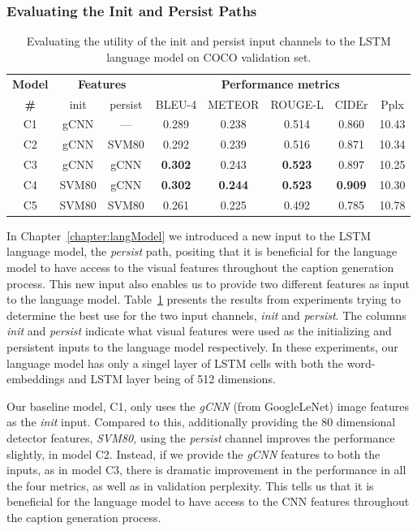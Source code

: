 \subsubsection{Evaluating the Init and Persist Paths}
\label{subsubsec:InitVpersist}
\begin{table}[htp]
  \centering
  \newcommand{\bs}{\small}
  \begin{adjustbox}{center}
  \begin{tabular}{|c||c|c||c|c|c|c|c|}
    \hline
    \bf Model & \multicolumn{2}{c||}{\bf Features 
    } & \multicolumn{5}{c|}{\bf Performance metrics}\\
     \cline{2-8}
    \bf \# & init & persist &\bs BLEU-4 &\bs METEOR &\bs ROUGE-L &\bs CIDEr&\bs Pplx \\\hline
    C1 & gCNN  & ---  & 0.289 & 0.238 & 0.514 & 0.860 & 10.43  \\
    C2 & gCNN  & SVM80& 0.292 & 0.239 & 0.516 & 0.871 & 10.34  \\
    C3 & gCNN  & gCNN &\bf 0.302 & 0.243 &\bf 0.523 & 0.897 & 10.25  \\
    C4 & SVM80 & gCNN &\bf 0.302 &\bf0.244 &\bf 0.523 &\bf0.909 & 10.30  \\
    C5 & SVM80 & SVM80& 0.261 & 0.225 & 0.492 & 0.785 & 10.78 \\\hline
  \end{tabular}
  \end{adjustbox}
  \caption{Evaluating the utility of the init and persist input channels to the
          LSTM language model on COCO validation set.}
  \label{tab:resCocInitVPers}
\end{table}

In Chapter~\ref{chapter:langModel} we introduced a new input to the LSTM language
model, the \emph{persist} path, positing that it is beneficial for the language
model to have access to the visual features throughout the caption generation
process.
This new input also enables us to provide two different features as input to the
language model.
Table~\ref{tab:resCocInitVPers} presents the results from experiments trying to
determine the best use for the two input channels, \emph{init} and
\emph{persist}.
The columns \emph{init} and \emph{persist} indicate what visual features were
used as the initializing and persistent inputs to the language model
respectively.
In these experiments, our language model has only a singel layer of LSTM cells
with both the word-embeddings and LSTM layer being of 512 dimensions.

Our baseline model, C1, only uses the \emph{gCNN} (from GoogleLeNet) image
features as the \emph{init} input.
Compared to this, additionally providing the 80 dimensional detector features,
\emph{SVM80},
using the \emph{persist} channel improves the performance slightly, in model C2.
Instead, if we provide the \emph{gCNN} features to both the inputs, as in model C3,
there is dramatic improvement in the performance in all the four metrics, as
well as in validation perplexity.
This tells us that it is beneficial for the language model to have access to the
CNN features throughout the caption generation process.

